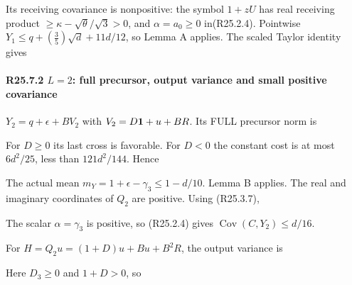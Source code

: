 Its receiving covariance is nonpositive: the symbol \(1+zU\) has real receiving product \(\ge \kappa-\sqrt{\theta}/\sqrt{3}>0\), and \(\alpha=a_0\ge 0\) in(R25.2.4). Pointwise \(Y_{1}\le q+(\frac{3}{5})\sqrt{d}+11d/12\), so Lemma A applies. The scaled Taylor identity gives


\paragraph{R25.7.2 \(L=2\): full precursor, output variance and small positive covariance}

\(Y_{2}=q+\epsilon+B V_{2}\) with \(V_{2}=D\mathbf1+u+BR\). Its FULL precursor norm is


For \(D\ge 0\) its last cross is favorable. For \(D<0\) the constant cost is at most \(6d^2/25\), less than \(121d^2/144\). Hence


The actual mean \(m_Y=1+\epsilon-\gamma_{3}\le 1-d/10\). Lemma B applies. The real and imaginary coordinates of \(Q_{2}\) are positive. Using (R25.3.7),


The scalar \(\alpha=\gamma_{3}\) is positive, so (R25.2.4) gives \(\operatorname{Cov}(C,\allowbreak \allowbreak Y_{2})\le d/16\).

For \(H=Q_2 u=(1+D)u+Bu+B^2R\), the output variance is


Here \(D_3\ge 0\) and \(1+D>0\), so


